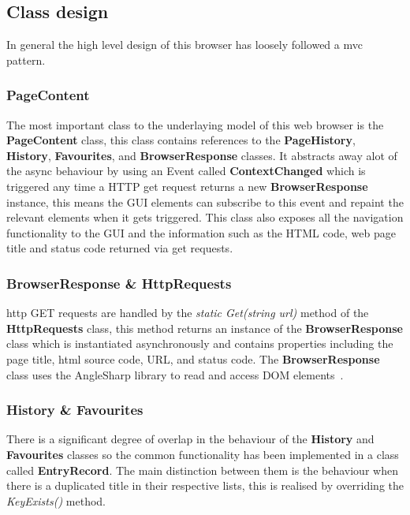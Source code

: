 \documentclass[../Main.tex]{subfiles}
\begin{document}
\subsection{Class design}\label{subsec:ClassDes}

In general the high level design of this browser has loosely followed a \acrshort{mvc} pattern. 

\subsubsection{PageContent}
The most important class to the underlaying model of this web browser is the \textbf{PageContent} class, this class contains references to the \textbf{PageHistory}, \textbf{History}, \textbf{Favourites}, and \textbf{BrowserResponse} classes. 
It abstracts away alot of the async behaviour by using an Event called \textbf{ContextChanged} which is triggered any time a HTTP get request returns a new \textbf{BrowserResponse} instance, this means the GUI elements can subscribe to this event and repaint the relevant elements when it gets triggered. 
This class also exposes all the navigation functionality to the GUI and the information such as the HTML code, web page title and status code returned via get requests.

\subsubsection{BrowserResponse \& HttpRequests}
\acrshort{http} GET requests are handled by the \emph{static Get(string url)} method of the \textbf{HttpRequests} class, this method returns an instance of the \textbf{BrowserResponse} class which is instantiated asynchronously and contains properties including the page title, \acrshort{html} source code, URL, and status code. The \textbf{BrowserResponse} class uses the AngleSharp library to read and access DOM elements~\autocite{AngleSharpHome}.

\subsubsection{History \& Favourites}
There is a significant degree of overlap in the behaviour of the \textbf{History} and \textbf{Favourites} classes so the common functionality has been implemented in a class called \textbf{EntryRecord}. The main distinction between them is the behaviour when there is a duplicated title in their respective lists, this is realised by overriding the \emph{KeyExists()} method.
\end{document}
